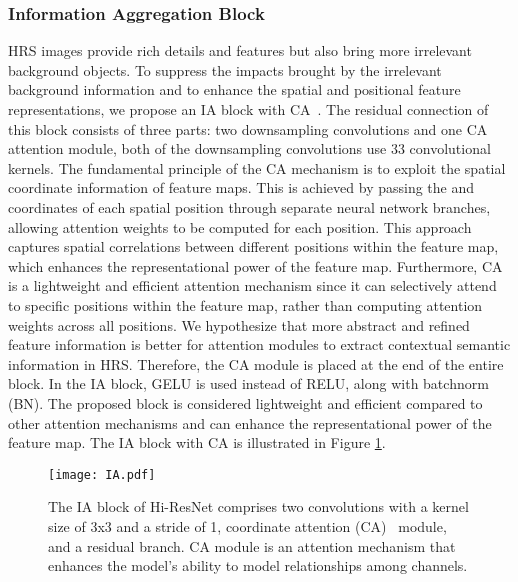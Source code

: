 \documentclass[journal]{IEEEtran}
\begin{document}
\subsubsection{Information Aggregation Block}
HRS images provide rich details and features but also bring more irrelevant background objects. To suppress the impacts brought by the irrelevant background information and to enhance the spatial and positional feature representations, we propose an IA block with CA~\cite{hou2021coordinate}. The residual connection of this block consists of three parts: two downsampling convolutions and one CA attention module, both of the downsampling convolutions use 33 convolutional kernels. The fundamental principle of the CA mechanism is to exploit the spatial coordinate information of feature maps. This is achieved by passing the  and  coordinates of each spatial position through separate neural network branches, allowing attention weights to be computed for each position. This approach captures spatial correlations between different positions within the feature map, which enhances the representational power of the feature map. Furthermore, CA is a lightweight and efficient attention mechanism since it can selectively attend to specific positions within the feature map, rather than computing attention weights across all positions. We hypothesize that more abstract and refined feature information is better for attention modules to extract contextual semantic information in HRS. Therefore, the CA module is placed at the end of the entire block. In the IA block, GELU is used instead of RELU, along with batchnorm (BN). The proposed block is considered lightweight and efficient compared to other attention mechanisms and can enhance the representational power of the feature map. The IA block with CA is illustrated in Figure \ref{fig:IA}.

\begin{figure}[!ht]
    \centering
    \texttt{[image: IA.pdf]}
    \caption{The IA block of Hi-ResNet comprises two convolutions with a kernel size of 3x3 and a stride of 1, coordinate attention (CA)~\cite{hou2021coordinate} module, and a residual branch. CA module is an attention mechanism that enhances the model's ability to model relationships among channels.}  
    \label{fig:IA}
\end{figure}
\end{document}
